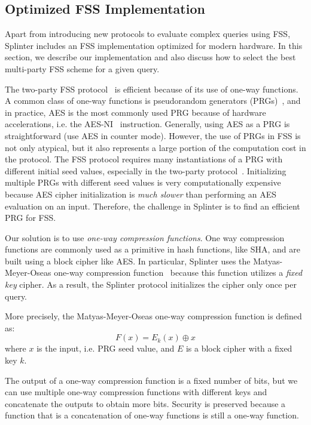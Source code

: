 \subsection{Optimized FSS Implementation}
\label{sec:fastfss}

Apart from introducing new protocols to evaluate complex queries using FSS,
Splinter includes an FSS implementation optimized for modern hardware.
In this section, we describe our implementation and also discuss
how to select the best multi-party FSS scheme for a given query.

The two-party FSS protocol~\cite{fss} is efficient
because of its use of one-way functions.
A common class of one-way functions is 
pseudorandom generators (PRGs)~\cite{levin1987one}, 
and in practice, 
AES is the most commonly used PRG because of hardware accelerations,
i.e. the AES-NI~\cite{aes-ni} instruction. 
Generally, using AES as a PRG is straightforward (use
AES in counter mode). However, the use of PRGs 
in FSS is not only atypical, but it also represents a large portion
of the computation cost in the protocol. The FSS protocol 
requires many instantiations 
of a PRG with different initial seed 
values, especially in the two-party 
protocol~\cite{fss}. Initializing multiple PRGs with
different seed values is very 
computationally expensive because AES cipher
initialization is \textit{much slower} than performing
an AES evaluation on an input. Therefore, 
the challenge in Splinter is to find an efficient PRG
for FSS.

Our solution is to use \textit{one-way compression functions}.
One way compression functions are commonly used as a primitive
in hash functions, like SHA, and are built using a block
cipher like AES. In particular, Splinter uses the Matyas-Meyer-Oseas one-way 
compression function~\cite{matyas1985} because
this function utilizes a \textit{fixed key} cipher. As a result, 
the Splinter protocol initializes the cipher only once per query.

More precisely, the Matyas-Meyer-Oseas one-way compression
function is defined as:
\begin{equation*}
F(x) = E_k(x) \oplus x
\end{equation*}
where $x$ is the input, i.e. PRG seed value, and $E$ is a block cipher with a fixed key $k$.

The output of a one-way compression function 
is a fixed number of bits, but we can
use multiple one-way compression functions with
different keys and concatenate the outputs to obtain more bits.
Security is preserved because a function that
is a concatenation of one-way functions is still a one-way function.

